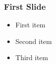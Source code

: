 \documentclass{beamer}
\begin{document}
\begin{frame}
\frametitle{First Slide}
\begin{itemize}
    \item First item
    \item Second item
    \item Third item
\end{itemize}
\end{frame}
\end{document}
